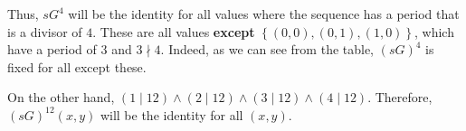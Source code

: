 \begin{problem}
\begin{Answer}
\bigskip
\color{zaffre}
\noindent
Thus, $sG^{4}$ will be the identity for all values where
  the sequence has a period that is a divisor of $4$.
  These are all values \textbf{except} $\left\{ (0,0), (0,1), (1,0) \right\}$,
  which have a period of $3$ and $3 \nmid 4$.
  Indeed, as we can see from the table, ${(sG)}^{4}$ is fixed for all except these.

\bigskip
On the other hand, $(1 \mid 12) \wedge (2 \mid 12) \wedge (3 \mid 12) \wedge (4 \mid 12)$.
  Therefore, ${(sG)}^{12}(x,y)$ will be the identity for all $(x,y)$. 

\color{black}
\end{Answer}

\end{problem}
